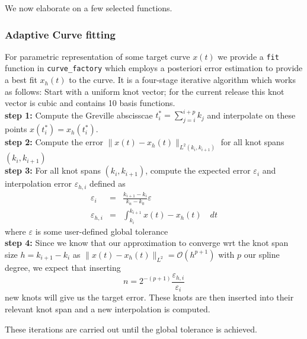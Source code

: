 \documentclass[preprint,12pt, a4paper]{elsarticle}
\begin{document}
We now elaborate on a few selected functions.

\subsubsection{Adaptive Curve fitting}
\label{sec:adaptive-curve-fit}
For parametric representation of some target curve $x(t)$ we provide a \texttt{fit} function in \texttt{curve\_factory} which employs a posteriori error estimation to provide a best fit $x_h(t)$ to the curve.
It is a four-stage iterative algorithm which works as follows:
Start with a uniform knot vector; for the current release this knot vector is cubic and contains 10  basis functions.
\\ \textbf{step 1:}
Compute the Greville abscisscae $t^*_i = \sum_{j=i}^{i+p} k_j$ and interpolate on these points $x(t_i^*) = x_h(t_i^*)$.
\\ \textbf{step 2:}
Compute the error $\|x(t)-x_h(t)\|_{L^2(k_i,k_{i+1})}$ for all knot spans $(k_i,k_{i+1})$
\\ \textbf{step 3:}
For all knot spans $(k_i,k_{i+1})$, compute the expected error $\varepsilon_i$ and interpolation error $\varepsilon_{h,i}$ defined as
\begin{eqnarray}
    \varepsilon_i     & = & \frac{k_{i+1} - k_i}{k_n - k_0}\varepsilon \\
    \varepsilon_{h,i} & = & \int_{k_i}^{k_{i+1}} x(t) - x_h(t)\quad dt
\end{eqnarray}
where $\varepsilon$ is some user-defined global tolerance
\\ \textbf{step 4:}
Since we know that our approximation \cite{deboor1978apg} to converge wrt the knot span size $h=k_{i+1}-k_i$ as $\|x(t)-x_h(t)\|_{L^2} = \mathcal{O}(h^{p+1})$ with $p$ our spline degree, we expect that inserting
\begin{equation}
    n = 2^{-(p+1)}\frac{\varepsilon_{h,i}}{\varepsilon_i}
\end{equation}
new knots will give us the target error.
These knots are then inserted into their relevant knot span and a new interpolation is computed.

These iterations are carried out until the global tolerance is achieved.
\end{document}
